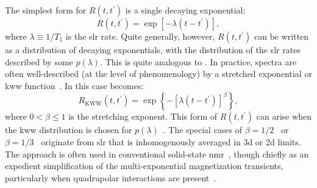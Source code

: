The simplest form for $R \left (t, t^{\prime} \right )$ is a single decaying exponential: 
%
\begin{equation} \label{eq:slr-integral}
   R \left (t, t^{\prime} \right ) = \exp \left [-  \lambda \left ( t - t^{\prime} \right ) \right ],
\end{equation}
%
where $\lambda \equiv 1 / T_{1}$ is the \gls{slr} rate. Quite generally, however, $R \left (t, t^{\prime} \right )$ can be written as a distribution of decaying exponentials, with the distribution of the \gls{slr} rates described by some $p(\lambda)$.
This is quite analogous to .
In practice, spectra are often well-described (at the level of phenomenology) by a stretched exponential or \gls{kww} function~\cite{1854-Kohlrausch-AP-167-179, 1970-Williams-TFS-66-80, 1980-Lindsay-JCP-73-3348, 2006-Johnston-PRB-74-184430, 2016-Wu-SR-6-20506}.
In this case  becomes:
%
\begin{equation} \label{eq:slr-stretched}
   R_\mathrm{KWW} \left ( t, t^{\prime} \right ) = \exp \left \{ - \left  [ \lambda \left ( t-t^{\prime} \right ) \right ]^{\beta} \right \},
\end{equation}
%
where $0 < \beta \leq 1$ is the stretching exponent.
This form of $R \left ( t, t^{\prime} \right )$ can arise when the \gls{kww} distribution is chosen for $p ( \lambda ) $~\cite{2006-Johnston-PRB-74-184430}.
The special cases of $\beta = 1/2$~\cite{1968-Tse-PRL-21-511, 1984-Stockmann-JNCS-66-501} or $\beta = 1/3$~\cite{1992-Bader-JPCM-4-4779} originate from \gls{slr} that is inhomogenously averaged in \gls{3d} or \gls{2d} limits.
The approach is often used in conventional solid-state \gls{nmr}~\cite{1995-Narayanan-JMRSA-112-58}, though chiefly as an expedient simplification of the multi-exponential magnetization transients, particularly when quadrupolar interactions are present~\cite{1995-McDowell-JMRSA-113-242}.


